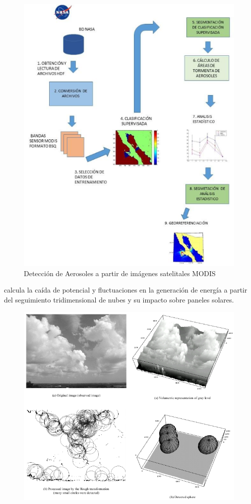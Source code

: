 \begin{figure}[htb]
  \centering 
  \includegraphics[scale=0.65]{pictures/ER8.png}
  \caption{ Detección de Aerosoles a partir de imágenes satelitales MODIS} 
  \label{fig:er8}
\end{figure}
\newpage
\cite{hashimoto2012prediction} calcula la caída de potencial y fluctuaciones en la generación de energía a partir del seguimiento tridimensional de nubes y su impacto sobre paneles solares.
\begin{figure}[htb]
  \centering 
  \includegraphics[scale=0.65]{pictures/ER5.png}
  \label{fig:er5}
\end{figure}
